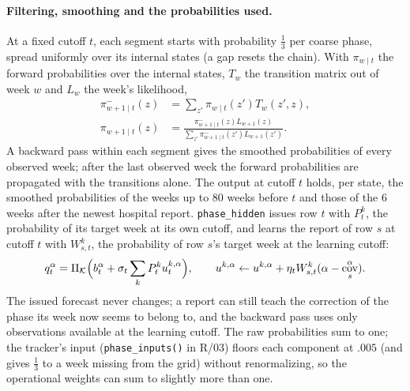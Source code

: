 \documentclass[11pt,a4paper]{article}
\newcommand{\K}{\mathcal{K}}
\DeclareMathOperator{\cov}{cov}
\theoremstyle{definition}
\theoremstyle{remark}
\begin{document}
\paragraph{Filtering, smoothing and the probabilities used.}
At a fixed cutoff $t$, each segment starts with probability $\frac13$ per
coarse phase, spread uniformly over its internal states (a gap resets
the chain). With $\pi_{w\mid t}$ the forward probabilities over the
internal states, $T_w$ the transition matrix out of week $w$ and $L_w$ the
week's likelihood,
\begin{align*}
 \pi^-_{w+1\mid t}(z)&=\sum_{z'}\pi_{w\mid t}(z')T_w(z',z),\\
 \pi_{w+1\mid t}(z)&=\frac{\pi^-_{w+1\mid t}(z)L_{w+1}(z)}
 {\sum_{z'}\pi^-_{w+1\mid t}(z')L_{w+1}(z')}.
\end{align*}
A backward pass within each segment gives the smoothed probabilities of
every observed week; after the last observed week the forward
probabilities are propagated with the transitions alone. The output at
cutoff $t$ holds, per state, the smoothed probabilities of the weeks up to
80 weeks before $t$ and those of the 6 weeks after the newest hospital
report. \texttt{phase\_hidden} issues row $t$ with $P_t^k$, the
probability of its target week at its own cutoff, and learns the report of
row $s$ at cutoff $t$ with $W_{s,t}^k$, the probability of row $s$'s target
week at the learning cutoff:
\[
 q_t^\alpha=\Pi_\K\Bigl(b_t^\alpha+\sigma_t\sum_kP_t^ku_t^{k,\alpha}\Bigr),
 \qquad
 u^{k,\alpha}\leftarrow u^{k,\alpha}+\eta_tW_{s,t}^k(\alpha-\cov_s^\alpha).
\]
The issued forecast never changes; a report can still teach the correction
of the phase its week now seems to belong to, and the backward pass uses
only observations available at the learning cutoff. The raw probabilities
sum to one; the tracker's input (\texttt{phase\_inputs()} in R/03) floors each
component at $.005$ (and gives $\frac13$ to a week missing from the grid)
without renormalizing, so the operational weights can sum to slightly more
than one.
\end{document}
